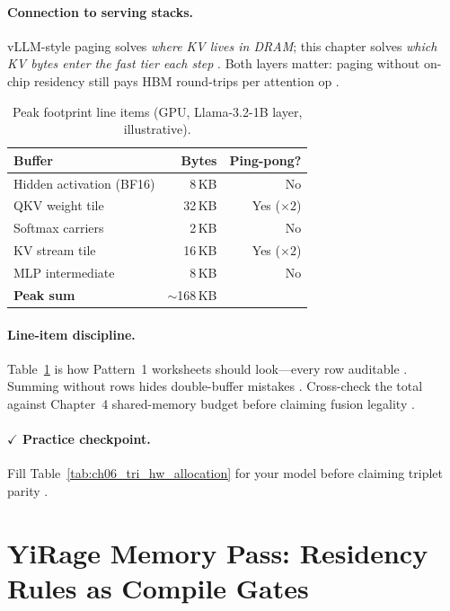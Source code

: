 \paragraph{Connection to serving stacks.}
vLLM-style paging solves \emph{where KV lives in DRAM}; this chapter solves \emph{which KV bytes enter the fast tier each step} \citep{kwon2023vllm,dao2023flashdecoding}.
Both layers matter: paging without on-chip residency still pays HBM round-trips per attention op \citep{taxbreak2026,memoryfloor2026}.

\begin{table}[t]
\centering
\small
\caption{Peak footprint line items (GPU, Llama-3.2-1B layer, illustrative).}
\label{tab:ch06_gpu_peak_line_items}
\begin{tabular}{@{}lrr@{}}
\toprule
\textbf{Buffer} & \textbf{Bytes} & \textbf{Ping-pong?} \\
\midrule
Hidden activation (BF16) & 8\,KB & No \\
QKV weight tile & 32\,KB & Yes ($\times 2$) \\
Softmax carriers & 2\,KB & No \\
KV stream tile & 16\,KB & Yes ($\times 2$) \\
MLP intermediate & 8\,KB & No \\
\midrule
\textbf{Peak sum} & {\footnotesize $\sim$168}\,KB & \\
\bottomrule
\end{tabular}
\end{table}

\paragraph{Line-item discipline.}
Table~\ref{tab:ch06_gpu_peak_line_items} is how Pattern~1 worksheets should look---every row auditable \citep{yirage2026,chen2020compilerbasedhardw}.
Summing without rows hides double-buffer mistakes \citep{semianalysis2024tma,memoryfloor2026}.
Cross-check the total against Chapter~4 shared-memory budget before claiming fusion legality \citep{nvidia2022hopper,taxbreak2026}.

\paragraph{$\checkmark$ Practice checkpoint.}
Fill Table~\ref{tab:ch06_tri_hw_allocation} for your model before claiming triplet parity \citep{yirage2026,amd2024xdna,nvidia2022hopper}.

\section{YiRage Memory Pass: Residency Rules as Compile Gates}
\label{sec:ch06_yirage_memory_pass}

